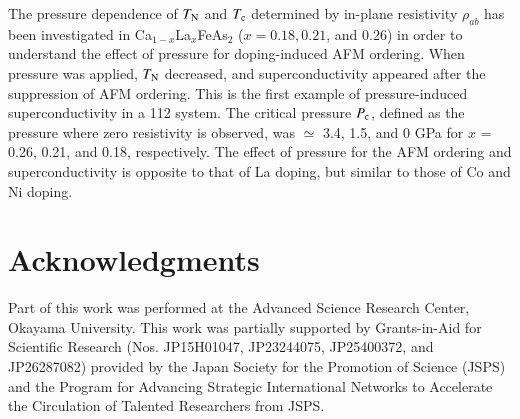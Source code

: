 \documentclass [letter,twocolumn]{jpsj3}
\begin{document}
The pressure dependence of $T_{\rm N}$ and $T_{\rm c}$ determined by in-plane resistivity $\rho_{ab}$ has been investigated in Ca$_{1-x}$La$_{x}$FeAs$_{2}$ ($x = 0.18, 0.21$, and 0.26) in order to understand the effect of pressure for doping-induced AFM ordering.
When pressure was applied, $T_{\rm N}$ decreased, and superconductivity appeared after the suppression of AFM ordering.
This is the first example of pressure-induced superconductivity in a 112 system.
The critical pressure $P_{\rm c}$, defined as the pressure where zero resistivity is observed, was $\simeq$ 3.4, 1.5, and 0 GPa for $x$ = 0.26, 0.21, and 0.18, respectively.
The effect of pressure for the AFM ordering and superconductivity is opposite to that of La doping, but similar to those of Co and Ni doping.


\section*{Acknowledgments}
Part of this work was performed at the Advanced Science Research Center, Okayama University. 
This work was partially supported by Grants-in-Aid for Scientific Research (Nos. JP15H01047, JP23244075, JP25400372, and JP26287082) provided by the Japan Society for the Promotion of Science (JSPS) and the Program for Advancing Strategic International Networks to Accelerate the Circulation of Talented Researchers from JSPS. 
\end{document}
